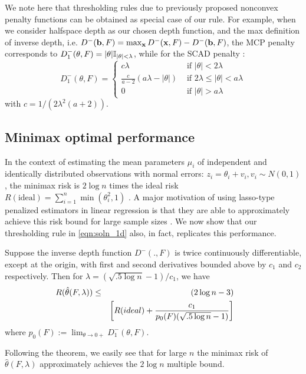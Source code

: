 We note here that thresholding rules due to previously proposed nonconvex penalty functions can be obtained as special case of our rule. For example, when we consider halfspace depth as our chosen depth function, and the max definition of inverse depth, i.e. $D^- ({\bf{b}}, F) = \max_{\bf{x}} D^- ({\bf{x}}, F) - D^- ({\bf{b}}, F)$, the MCP penalty \citep{CHZhang10} corresponds to $D^-_1(\theta,F) = |\theta| {\mathbb{I}}_{ |\theta| < \lambda }$, while for the SCAD penalty \citep{FanLi01}:
%
$$
D^-_1(\theta,F) = \begin{cases} c\lambda & \text{ if } |\theta| < 2 \lambda\\
\frac{c}{a-2} (a \lambda - |\theta|) & \text{ if } 2\lambda \leq |\theta| < a \lambda\\
0 & \text{ if } |\theta| > a \lambda
\end{cases}
$$
%
with $c = 1/(2\lambda^2(a+2))$.

\subsection{Minimax optimal performance}

In the context of estimating the mean parameters $\mu_i$ of independent and identically distributed observations with normal errors: $z_i = \theta_i + v_i, v_i \sim N(0, 1)$, the minimax risk is $2\log n$ times the ideal risk $R(\text{ideal}) = \sum_{i=1}^n \min (\theta_i^2, 1)$ \citep{DonohoJohnstone94}. A major motivation of using lasso-type penalized estimators in linear regression is that they are able to approximately achieve this risk bound for large sample sizes \citep{DonohoJohnstone94, Zou06}. We now show that our thresholding rule in \ref{eqn:soln_1d} also, in fact, replicates this performance.

\begin{Theorem}\label{thm:minimaxThm}
Suppose the inverse depth function $D^-(.,F)$ is twice continuously differentiable, except at the origin, with first and second derivatives bounded above by $c_1$ and $c_2$ respectively. Then for $\lambda = (\sqrt{.5 \log n}-1)/c_1$, we have
%
\begin{eqnarray}
\hspace{-2em} R ( \hat\theta(F,\lambda)) & \leq & (2 \log n - 3) \notag\\
&& \left[ R(ideal) + \frac{c_1}{p_0(F) (\sqrt{.5 \log n}-1) } \right]
\end{eqnarray}
%
where $p_0(F) := \lim_{\theta \rightarrow 0+} D^-_1(\theta, F)$.
\end{Theorem}
%
\noindent Following the theorem, we easily see that for large $n$ the minimax risk of $\hat\theta(F,\lambda)$ approximately achieves the $2 \log n$ multiple bound.

